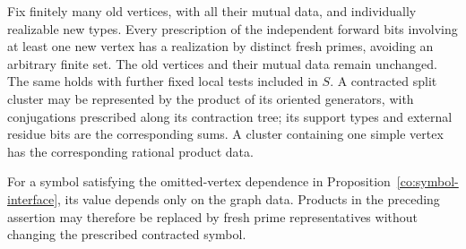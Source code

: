 \begin{lemma}\label{gr:realization}
Fix finitely many old vertices, with all their mutual data, and
individually realizable new types.  Every prescription of the independent
forward bits involving at least one new vertex has a realization by
distinct fresh primes, avoiding an arbitrary finite set.  The old vertices
and their mutual data remain unchanged.  The same holds
with further fixed local tests included in $S$.  A contracted split cluster
may be represented by the product of its oriented generators, with
conjugations prescribed along its contraction tree; its support types and
external residue bits are the corresponding sums.  A cluster containing
one simple vertex has the corresponding rational product data.

For a symbol satisfying the omitted-vertex dependence in
Proposition~\ref{co:symbol-interface}, its value depends only on the graph
data.  Products in the preceding assertion may therefore be replaced by
fresh prime representatives without changing the prescribed contracted
symbol.
\end{lemma}

